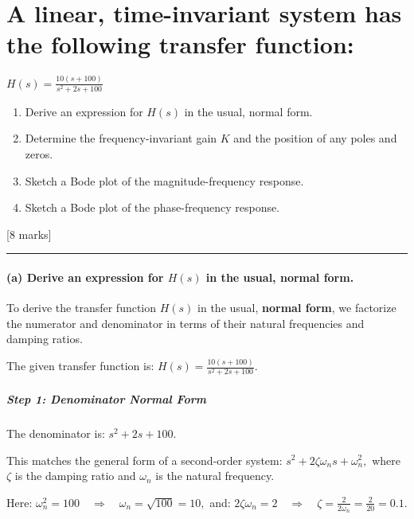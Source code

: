 \documentclass[11pt]{article}
\begin{document}
    

    \section{A linear, time-invariant system has the following transfer
function:}\label{a-linear-time-invariant-system-has-the-following-transfer-function}

\(H(s) = \frac{10(s + 100)}{s^2 + 2s + 100}\)

\begin{enumerate}
\def\labelenumi{(\alph{enumi})}
\item
  Derive an expression for \(H(s)\) in the usual, normal form.
\item
  Determine the frequency-invariant gain \(K\) and the position of any
  poles and zeros.
\item
  Sketch a Bode plot of the magnitude-frequency response.
\item
  Sketch a Bode plot of the phase-frequency response.
\end{enumerate}

{[}8 marks{]}

    \begin{center}\rule{0.5\linewidth}{0.5pt}\end{center}

\paragraph{\texorpdfstring{(a) Derive an expression for \(H(s)\) in the
usual, normal
form.}{(a) Derive an expression for H(s) in the usual, normal form.}}\label{a-derive-an-expression-for-hs-in-the-usual-normal-form.}

To derive the transfer function \(H(s)\) in the usual, \textbf{normal
form}, we factorize the numerator and denominator in terms of their
natural frequencies and damping ratios.

The given transfer function is:
\(H(s) = \frac{10(s + 100)}{s^2 + 2s + 100}.\)

\subparagraph{Step 1: Denominator Normal
Form}\label{step-1-denominator-normal-form}

The denominator is: \(s^2 + 2s + 100.\)

This matches the general form of a second-order system:
\(s^2 + 2\zeta\omega_n s + \omega_n^2,\) where \(\zeta\) is the damping
ratio and \(\omega_n\) is the natural frequency.

Here:
\(\omega_n^2 = 100 \quad \Rightarrow \quad \omega_n = \sqrt{100} = 10,\)
and:
\(2\zeta\omega_n = 2 \quad \Rightarrow \quad \zeta = \frac{2}{2\omega_n} = \frac{2}{20} = 0.1.\)
\end{document}
